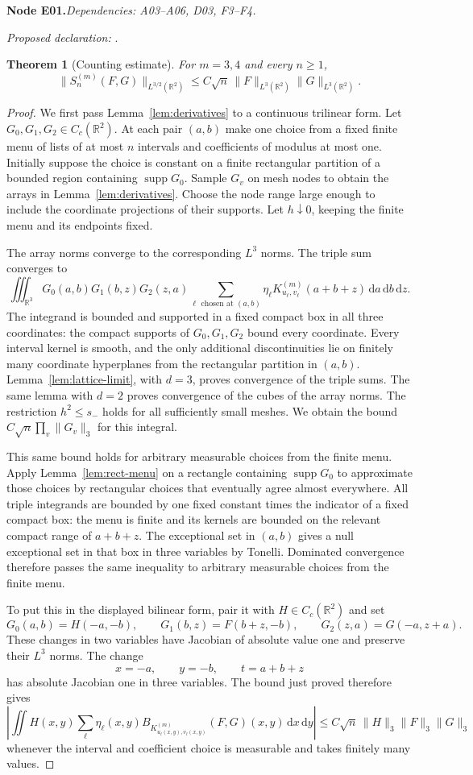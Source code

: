 \documentclass[11pt]{article}
\newtheorem{theorem}{Theorem}[section]
\theoremstyle{remark}\newtheorem{remark}[theorem]{Remark}
\newcommand{\R}{\mathbb R}\newcommand{\C}{\mathbb C}
\newcommand{\dd}{\,\mathrm d}\newcommand{\tr}{\operatorname{tr}}
\newcommand{\supp}{\operatorname{supp}}\newcommand{\op}{\mathrm{op}}
\newcommand{\bpnode}[3]{\par\Needspace{5\baselineskip}\noindent\textbf{Node #1.}\quad\textit{Dependencies: #2.}\par\noindent\textit{Proposed declaration:} \texttt{\detokenize{#3}}.\par\smallskip}
\begin{document}
\bpnode{E01}{A03--A06, D03, F3--F4}{Euclidean_counting_bound}
\begin{theorem}[Counting estimate]\label{thm:count}
For $m=3,4$ and every $n\geq1$,
\[
 \|S^{(m)}_n(F,G)\|_{L^{3/2}(\R^2)}
 \leq C\sqrt n\,\|F\|_{L^3(\R^2)}\|G\|_{L^3(\R^2)}.
\]
\end{theorem}
\begin{proof}
We first pass Lemma~\ref{lem:derivatives} to a continuous trilinear form. Let $G_0,G_1,G_2\in C_c(\R^2)$. At each pair $(a,b)$ make one choice from a fixed finite menu of lists of at most $n$ intervals and coefficients of modulus at most one. Initially suppose the choice is constant on a finite rectangular partition of a bounded region containing $\supp G_0$. Sample $G_v$ on mesh nodes to obtain the arrays in Lemma~\ref{lem:derivatives}. Choose the node range large enough to include the coordinate projections of their supports. Let $h\downarrow0$, keeping the finite menu and its endpoints fixed.

The array norms converge to the corresponding $L^3$ norms. The triple sum converges to
\[
 \iiint_{\R^3}G_0(a,b)G_1(b,z)G_2(z,a)
  \sum_{\ell\text{ chosen at }(a,b)}\eta_\ell
  K^{(m)}_{u_\ell,v_\ell}(a+b+z)\dd a\dd b\dd z.
\]
The integrand is bounded and supported in a fixed compact box in all three coordinates: the compact supports of $G_0,G_1,G_2$ bound every coordinate. Every interval kernel is smooth, and the only additional discontinuities lie on finitely many coordinate hyperplanes from the rectangular partition in $(a,b)$. Lemma~\ref{lem:lattice-limit}, with $d=3$, proves convergence of the triple sums. The same lemma with $d=2$ proves convergence of the cubes of the array norms. The restriction $h^2\leq s_-$ holds for all sufficiently small meshes. We obtain the bound $C\sqrt n\prod_v\|G_v\|_3$ for this integral.

This same bound holds for arbitrary measurable choices from the finite menu. Apply Lemma~\ref{lem:rect-menu} on a rectangle containing $\supp G_0$ to approximate those choices by rectangular choices that eventually agree almost everywhere. All triple integrands are bounded by one fixed constant times the indicator of a fixed compact box: the menu is finite and its kernels are bounded on the relevant compact range of $a+b+z$. The exceptional set in $(a,b)$ gives a null exceptional set in that box in three variables by Tonelli. Dominated convergence therefore passes the same inequality to arbitrary measurable choices from the finite menu.

To put this in the displayed bilinear form, pair it with $H\in C_c(\R^2)$ and set
\[
 G_0(a,b)=H(-a,-b),\qquad G_1(b,z)=F(b+z,-b),\qquad G_2(z,a)=G(-a,z+a).
\]
These changes in two variables have Jacobian of absolute value one and preserve their $L^3$ norms. The change
\[
 x=-a,\qquad y=-b,\qquad t=a+b+z
\]
has absolute Jacobian one in three variables. The bound just proved therefore gives
\[
 \left|\iint H(x,y)\sum_\ell\eta_\ell(x,y)
       B_{K^{(m)}_{u_\ell(x,y),v_\ell(x,y)}}(F,G)(x,y)\dd x\dd y\right|
 \leq C\sqrt n\,\|H\|_3\|F\|_3\|G\|_3
\]
whenever the interval and coefficient choice is measurable and takes finitely many values.


\end{proof}
\end{document}

